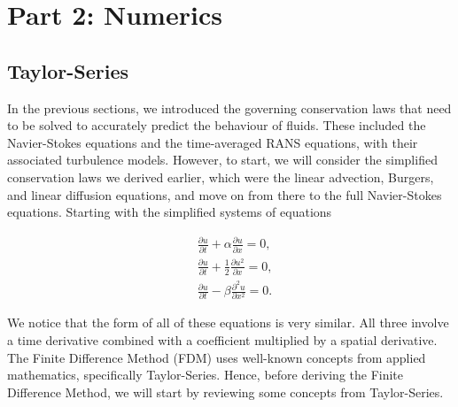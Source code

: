\part{Part 2: Numerics}


\chapter{Taylor-Series}
In the previous sections, we introduced the governing conservation laws that need to be solved to accurately predict the behaviour of fluids. These included the Navier-Stokes equations and the time-averaged RANS equations, with their associated turbulence models. However, to start, we will consider the simplified conservation laws we derived earlier, which were the linear advection, Burgers, and linear diffusion equations, and move on from there to the full Navier-Stokes equations. Starting with the simplified systems of equations
\begin{eqBox}
\begin{align}
	&\frac{\partial u}{\partial t} +  \alpha \frac{\partial u}{\partial x} = 0,\\
	&\frac{\partial u}{\partial t} +  \frac{1}{2} \frac{\partial u^2}{\partial x} = 0,\\
	&\frac{\partial u}{\partial t} - \beta \frac{\partial^2 u}{\partial x^2} = 0.
\end{align}
\end{eqBox}
We notice that the form of all of these equations is very similar. All three involve a time derivative combined with a coefficient multiplied by a spatial derivative. The Finite Difference Method (FDM) uses well-known concepts from applied mathematics, specifically Taylor-Series. Hence, before deriving the Finite Difference Method, we will start by reviewing some concepts from Taylor-Series.


